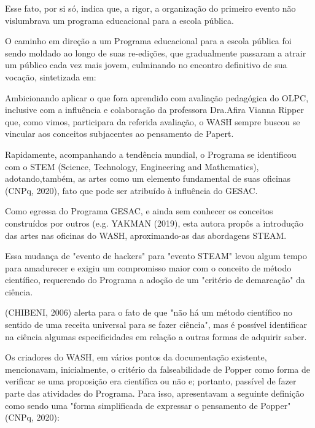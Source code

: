 Esse fato, por si só, indica que, a rigor, a organização do primeiro evento não vislumbrava um programa educacional para a escola pública.

O caminho em direção a um Programa educacional para a escola pública foi sendo moldado ao longo de suas re-edições, que gradualmente passaram a atrair um público cada vez mais jovem, culminando no encontro definitivo de sua vocação, sintetizada em:


\noindent\begin{center}\mbox{\centering{}}\end{center}


Ambicionando aplicar o que fora aprendido com avaliação pedagógica do OLPC, inclusive com a influência e colaboração da professora Dra.Afira Vianna Ripper que, como vimos, participara da referida avaliação, o WASH sempre buscou se vincular aos conceitos subjacentes ao pensamento de Papert.

Rapidamente, acompanhando a tendência mundial, o Programa se identificou com o STEM (Science, Technology, Engineering and Mathematics), adotando,também, as artes como um elemento fundamental de suas oficinas  (CNPq, 2020), fato que pode ser atribuído à influência do GESAC.

Como egressa do Programa GESAC, e ainda sem conhecer os conceitos construídos por outros (e.g. YAKMAN (2019), esta autora propôs a introdução das artes nas oficinas do WASH, aproximando-as das abordagens STEAM.

Essa mudança de "evento de hackers" para "evento STEAM" levou algum tempo para amadurecer e exigiu um compromisso maior com o conceito de método científico, requerendo do Programa a adoção de um "critério de demarcação" da ciência.

(CHIBENI, 2006) alerta para o fato de que "não há um método científico no sentido de uma receita universal para se fazer ciência", mas é possível identificar na ciência algumas especificidades em relação a outras formas de adquirir saber.

Os criadores do WASH, em vários pontos da documentação existente, mencionavam, inicialmente, o critério da falseabilidade de Popper como forma de verificar se uma proposição era científica ou não e; portanto, passível de fazer parte das atividades do Programa. Para isso, apresentavam a seguinte definição como sendo uma "forma simplificada de expressar o pensamento de Popper" (CNPq, 2020):


